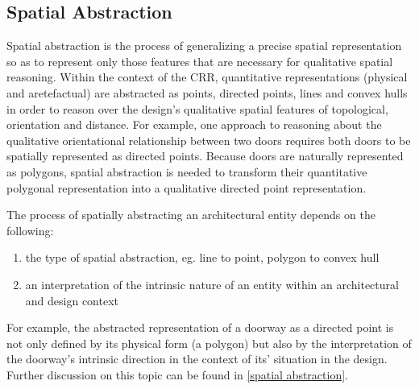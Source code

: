 \documentclass[12pt]{ucthesis}
\begin{document}
\subsection{Spatial Abstraction}
Spatial abstraction is the process of generalizing a precise spatial representation so as to represent only those features that are necessary for qualitative spatial reasoning. Within the context of the CRR, quantitative representations (physical and aretefactual) are abstracted as points, directed points, lines and convex hulls in order to reason over the design's qualitative spatial features of topological, orientation and distance. For example, one approach to reasoning about the qualitative orientational relationship between two doors requires both doors to be spatially represented as directed points. Because doors are naturally represented as polygons, spatial abstraction is needed to transform their quantitative polygonal representation into a qualitative directed point representation.



The process of spatially abstracting an architectural entity depends on the following:
\begin{enumerate} \label{abs dependencies}
\item the type of spatial abstraction, eg. line to point, polygon to convex hull
\item an interpretation of the intrinsic nature of an entity within an architectural and design context
\end{enumerate}
For example, the abstracted representation of a doorway as a directed point is not only defined by its physical form (a polygon) but also by the interpretation of the doorway's intrinsic direction in the context of its' situation in the design. Further discussion on this topic can be found in \ref{spatial abstraction}.
\end{document}

